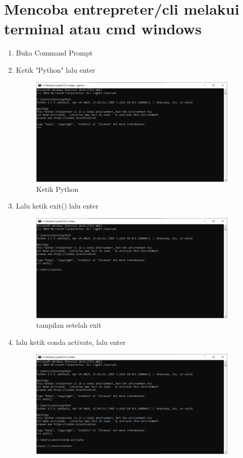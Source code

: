 \section{Mencoba entrepreter/cli melakui terminal atau cmd windows}
    \begin{enumerate}
        \item Buka Command Prompt
        \item Ketik "Python" lalu enter
        \begin{figure}[!htpb]
			\includegraphics[width=10cm]{figures/envinew.PNG}
				\centering
			\caption{Ketik Python}
		\end{figure}
		\newpage
        \item Lalu ketik exit() lalu enter
        \begin{figure}[!htpb]
			\includegraphics[width=10cm]{figures/envi2.PNG}
				\centering
			\caption{tampilan setelah exit}
		\end{figure}
		\item lalu ketik conda activate, lalu enter
		\begin{figure}[!htpb]
			\includegraphics[width=10cm]{figures/envi3.PNG}

\end{figure}
\end{enumerate}
